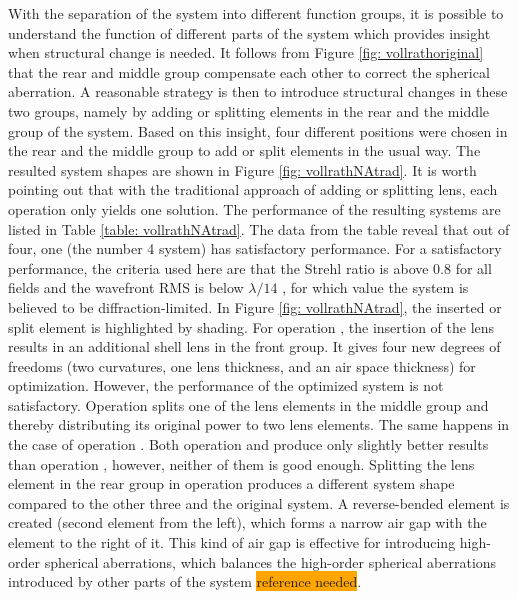 With the separation of the system into different function groups, it is possible to understand the function of different parts of the system which provides insight when structural change is needed. It follows from Figure \ref{fig: vollrathoriginal} that the rear and middle group compensate each other to correct the spherical aberration. A reasonable strategy is then to introduce structural changes in these two groups, namely by adding or splitting elements in the rear and the middle group of the system. Based on this insight, four different positions were chosen in the rear and the middle group to add or split elements in the usual way. The resulted system shapes are shown in Figure \ref{fig: vollrathNAtrad}. It is worth pointing out that with the traditional approach of adding or splitting lens, each operation only yields one solution. The performance of the resulting systems are listed in Table \ref{table: vollrathNAtrad}. The data from the table reveal that out of four, one (the number 4 system) has satisfactory performance. For a satisfactory performance, the criteria used here are that the Strehl ratio is above 0.8 for all fields and the wavefront RMS is below $\lambda/14$ \cite{patentvollrath}, for which value the system is believed to be diffraction-limited. In Figure \ref{fig: vollrathNAtrad}, the inserted or split element is highlighted by shading. For operation , the insertion of the lens results in an additional shell lens in the front group. It gives four new degrees of freedoms (two curvatures, one lens thickness, and an air space thickness) for optimization. However, the performance of the optimized system is not satisfactory. Operation  splits one of the lens elements in the middle group and thereby distributing its original power to two lens elements. The same happens in the case of operation . Both operation  and  produce only slightly better results than operation , however, neither of them is good enough. Splitting the lens element in the rear group in operation  produces a different system shape compared to the other three and the original system. A reverse-bended element is created (second element from the left), which forms a narrow air gap with the element to the right of it. This kind of air gap is effective for introducing high-order spherical aberrations, which balances the high-order spherical aberrations introduced by other parts of the system \colorbox{orange}{reference needed}. 

